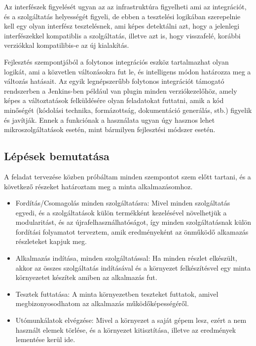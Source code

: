 \documentclass[11pt,magyar,a4paper,twoside,]{report}
\providecommand{\tightlist}{%
  \setlength{\itemsep}{0pt}\setlength{\parskip}{0pt}}
\begin{document}
Az interfészek figyelését ugyan az az infrastruktúra figyelheti ami az
integrációt, és a szolgáltatás helyességét figyeli, de ebben a
tesztelési logikában szerepelnie kell egy olyan interfész tesztelésnek,
ami képes detektálni azt, hogy a jelenlegi interfészekkel kompatiblis a
szolgáltatás, illetve azt is, hogy visszafelé, korábbi verziókkal
kompatilibis-e az új kialakítás.

Fejlesztés szempontjából a folytonos integrációs eszköz tartalmazhat
olyan logikát, ami a közvetlen változásokra fut le, és intelligens módon
határozza meg a változás hatásait. Az egyik legnépszerűbb folytonos
integrációt támogató rendszerben a Jenkins-ben például van plugin minden
verziókezelőhöz, amely képes a változtatások felküldésére olyan
feladatokat futtatni, amik a kód minőségét (kódolási technika,
formázottság, dokumentáció generálás, stb.) figyelik és javítják. Ennek
a funkciónak a használata ugyan úgy hasznos lehet mikroszolgáltatások
esetén, mint bármilyen fejlesztési módszer esetén.

\subsection{Lépések bemutatása}\label{luxe9puxe9sek-bemutatuxe1sa}

A feladat tervezése közben próbáltam minden szempontot szem előtt
tartani, és a következő részeket határoztam meg a minta alkalmazásomhoz.

\begin{itemize}
\tightlist
\item
  Fordítás/Csomagolás minden szolgáltatásra: Mivel minden szolgáltatás
  egyedi, és a szolgáltatások külön termékként kezelésével növelhetjük a
  modularitást, és az újrafelhasználhatóságot, így minden
  szolgáltatásnak külön fordítási folyamatot terveztem, amik
  eredményeként az önműködő alkamazás részleteket kapjuk meg.
\item
  Alkalmazás indítása, minden szolgáltatással: Ha minden részlet
  elkészült, akkor az összes szolgáltatás indításával és a környezet
  felkészítésvel egy minta környezetet készítek amiben az alkalmazás
  fut.
\item
  Tesztek futtatása: A minta környezetben teszteket futtatok, amivel
  megbizonyosodhatom az alkalmazás működőképességéről.
\item
  Utómunkálatok elvégzése: Mivel a környezet a saját gépem lesz, ezért a
  nem használt elemek törlése, és a környezet kitisztítása, illetve az
  eredmények lementése kerül ide.
\end{itemize}
\end{document}
